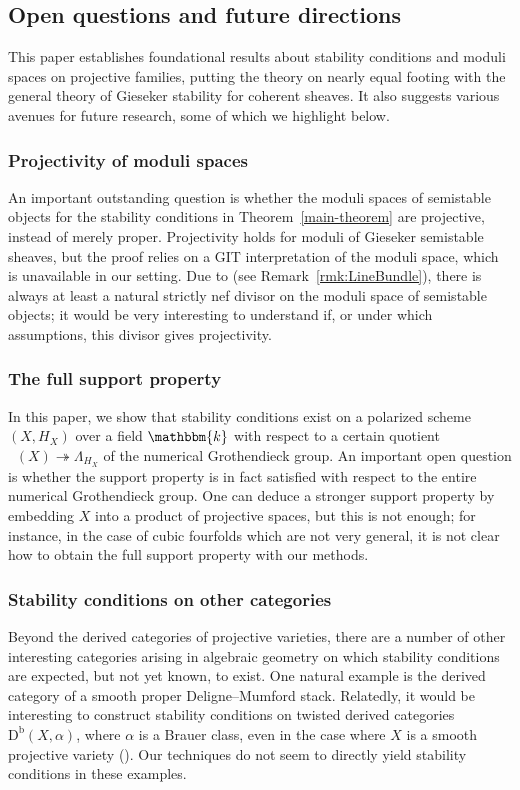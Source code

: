 \documentclass[11pt, reqno]{amsart}
\numberwithin{equation}{section}
\theoremstyle{plain}
\theoremstyle{remark}
\theoremstyle{definition}
\theoremstyle{italicsname}
\newcommand{\Db}{\mathrm{D^b}}
\newcommand{\num}{\mathrm{num}}
\DeclareMathOperator{\Knum}{\rK_{\num}}
\newcommand{\rK}{\mathrm{K}}
\newcommand{\KK}{\mathbbm{k}}
\begin{document}
\subsection{Open questions and future directions} 
This paper establishes foundational results about stability conditions and moduli spaces on projective families, putting the theory on nearly equal footing with the general theory of Gieseker stability for coherent sheaves.  
It also suggests various avenues for future research, some of which we highlight below.

\subsubsection*{Projectivity of moduli spaces} 
An important outstanding question is whether the moduli spaces of semistable objects for the stability conditions in Theorem~\ref{main-theorem} are projective, instead of merely proper. 
Projectivity holds for moduli of Gieseker semistable sheaves, but the proof relies on a GIT interpretation of the moduli space, which is unavailable in our setting. 
Due to \cite{BM-nef-divisor} (see Remark~\ref{rmk:LineBundle}), there is always at least a natural strictly nef divisor on the moduli space of semistable objects; it would be very interesting to understand if, or under which assumptions, this divisor gives projectivity.

\subsubsection*{The full support property} 
In this paper, we show that stability conditions exist on a polarized scheme $(X, H_X)$ over a field $\KK$ with respect to a certain quotient $\Knum(X) \twoheadrightarrow \Lambda_{H_X}$ of the numerical Grothendieck group. 
An important open question is whether the support property is in fact satisfied with respect to the entire numerical Grothendieck group. 
One can deduce a stronger support property by embedding $X$ into a product of projective spaces, but this is not enough; for instance, in the case of cubic fourfolds which are not very general, it is not clear how to obtain the full support property with our methods. 

\subsubsection*{Stability conditions on other categories} 
Beyond the derived categories of projective varieties, 
there are a number of other interesting categories arising in algebraic geometry on which stability conditions are expected, but not yet known, to exist. 
One natural example is the derived category of a smooth proper Deligne--Mumford stack.
Relatedly, it would be interesting to construct stability conditions on twisted derived categories $\Db(X, \alpha)$, where $\alpha$ is a Brauer class, even in the case where $X$ is a smooth projective variety (\cite{Yos:Twisted,HS:Twisted,Lieblich:Twisted,HP:PeriodIndex}). 
Our techniques do not seem to directly yield stability conditions in these examples. 
\end{document}

